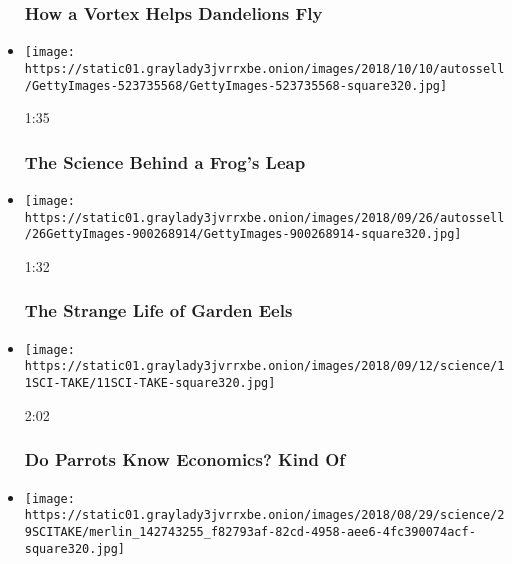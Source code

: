 \begin{itemize}
  \hypertarget{how-a-vortex-helps-dandelions-fly}{%
  \subsubsection{How a Vortex Helps Dandelions
  Fly}\label{how-a-vortex-helps-dandelions-fly}}
\item
  \href{https://www.nytimes3xbfgragh.onion/video/science/100000006102476/frog-jump-study.html?action=click\&module=video-series-bar\&region=header\&pgtype=Article\&playlistId=video/sciencetake}{}

  \texttt{[image: https://static01.graylady3jvrrxbe.onion/images/2018/10/10/autossell/GettyImages-523735568/GettyImages-523735568-square320.jpg]}

  1:35

  \hypertarget{the-science-behind-a-frogs-leap}{%
  \subsubsection{The Science Behind a Frog's
  Leap}\label{the-science-behind-a-frogs-leap}}
\item
  \href{https://www.nytimes3xbfgragh.onion/video/science/100000006090485/the-strange-life-of-garden-eels.html?action=click\&module=video-series-bar\&region=header\&pgtype=Article\&playlistId=video/sciencetake}{}

  \texttt{[image: https://static01.graylady3jvrrxbe.onion/images/2018/09/26/autossell/26GettyImages-900268914/GettyImages-900268914-square320.jpg]}

  1:32

  \hypertarget{the-strange-life-of-garden-eels}{%
  \subsubsection{The Strange Life of Garden
  Eels}\label{the-strange-life-of-garden-eels}}
\item
  \href{https://www.nytimes3xbfgragh.onion/video/science/100000006079698/parrots-economics-study.html?action=click\&module=video-series-bar\&region=header\&pgtype=Article\&playlistId=video/sciencetake}{}

  \texttt{[image: https://static01.graylady3jvrrxbe.onion/images/2018/09/12/science/11SCI-TAKE/11SCI-TAKE-square320.jpg]}

  2:02

  \hypertarget{do-parrots-know-economics-kind-of}{%
  \subsubsection{Do Parrots Know Economics? Kind
  Of}\label{do-parrots-know-economics-kind-of}}
\item
  \texttt{[image: https://static01.graylady3jvrrxbe.onion/images/2018/08/29/science/29SCITAKE/merlin\_142743255\_f82793af-82cd-4958-aee6-4fc390074acf-square320.jpg]}


\end{itemize}

